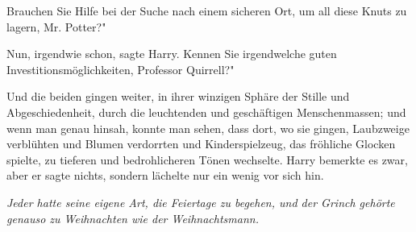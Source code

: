 \glqq Brauchen Sie Hilfe bei der Suche nach einem sicheren Ort, um all diese
Knuts zu lagern, Mr. Potter?"

\glqq Nun, irgendwie schon\grqq{}, sagte Harry. \glqq Kennen Sie irgendwelche
guten Investitionsmöglichkeiten, Professor Quirrell?"

Und die beiden gingen weiter, in ihrer winzigen Sphäre der Stille und
Abgeschiedenheit, durch die leuchtenden und geschäftigen Menschenmassen; und
wenn man genau hinsah, konnte man sehen, dass dort, wo sie gingen, Laubzweige
verblühten und Blumen verdorrten und Kinderspielzeug, das fröhliche Glocken
spielte, zu tieferen und bedrohlicheren Tönen wechselte. Harry bemerkte es zwar,
aber er sagte nichts, sondern lächelte nur ein wenig vor sich hin.

\emph{Jeder hatte seine eigene Art, die Feiertage zu begehen, und der Grinch
gehörte genauso zu Weihnachten wie der Weihnachtsmann.}

